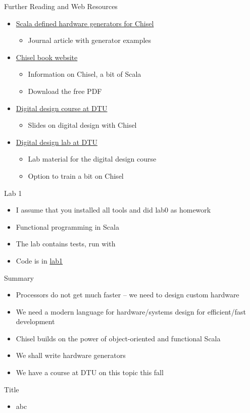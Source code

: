 \begin{frame}[fragile]{Further Reading and Web Resources}
\begin{itemize}
\item \href{https://www.sciencedirect.com/science/article/pii/S014193312500050X}{Scala defined hardware generators for Chisel}
\begin{itemize}
\item Journal article with generator examples
\end{itemize}
\item \href{http://www.imm.dtu.dk/~masca/chisel-book.html}{Chisel book website}
\begin{itemize}
\item Information on Chisel, a bit of Scala
\item Download the free PDF
\end{itemize}
\item \href{http://www2.imm.dtu.dk/courses/02139/}{Digital design course at DTU}
\begin{itemize}
\item Slides on digital design with Chisel
\end{itemize}
\item \href{https://github.com/schoeberl/chisel-lab}{Digital design lab at DTU}
\begin{itemize}
\item Lab material for the digital design course
\item Option to train a bit on Chisel
\end{itemize}
\end{itemize}
\end{frame}


\begin{frame}[fragile]{Lab 1}
\begin{itemize}
\item I assume that you installed all tools and did lab0 as homework
\item Functional programming in Scala
\item The lab contains tests, run with 
\item Code is in \href{https://github.com/schoeberl/agile-hw/tree/main/lab1}{lab1}
\end{itemize}
\end{frame}


\begin{frame}[fragile]{Summary}
\begin{itemize}
\item Processors do not get much faster -- we need to design custom hardware
\item We need a modern language for hardware/systems design for efficient/fast development
\item Chisel builds on the power of object-oriented and functional Scala
\item We shall write hardware generators
\item We have a course at DTU on this topic this fall
\end{itemize}
\end{frame}




\begin{frame}[fragile]{Title}
\begin{itemize}
\item abc
\end{itemize}
\end{frame}

